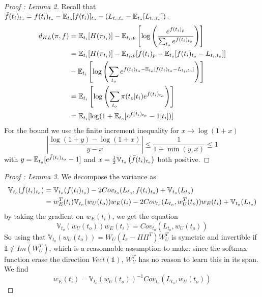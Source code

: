 \documentclass{article}
\begin{document}
\begin{proof}[Proof : Lemma 2]
    Recall that $\Bar{f}(t_i)_{t_o} = f({t_i})_{t_o}-\mathbb{E}_{t_o}[f({t_i})]_{t_o} - (L_{{t_i},{t_o}}-\mathbb{E}_{t_o}[L_{{t_i},{t_o}}])$.
    \begin{equation}
        \begin{split}
            d_{KL}(\pi, f) &= \mathbb{E}_{{t_i}}[H(\pi_{t_i})]-\mathbb{E}_{{t_i},p}\left[\log\left(\frac{e^{f({t_i})_p}}{\sum_{t_o}e^{f({t_i})_{t_o}}}\right)\right]\\
            &=\mathbb{E}_{{t_i}}[H(\pi_{t_i})]-\mathbb{E}_{{t_i},p}[f({t_i})_p-\mathbb{E}_{t_o}[f({t_i})_{t_o}-L_{{t_i},{t_o}}]]\\
            &-\mathbb{E}_{{t_i}}\left[\log\left(\sum_{t_o}e^{f({t_i})_{t_o}-\mathbb{E}_{t_o}[f({t_i})_{t_o}-L_{{t_i},{t_o}}]}\right)\right]\\
            &=\mathbb{E}_{{t_i}}\left[\log\left(\sum_{t_o}\pi({t_o}|{t_i})e^{\Bar{f}(t_i)_{t_o}}\right)\right] \\
            &= \mathbb{E}_{t_i}[\log(1+\mathbb{E}_{t_o}[e^{\Bar{f}(t_i)_{t_o}}-1|{t_i}])]
        \end{split}
    \end{equation}
    For the bound we use the finite increment inequality for $x\rightarrow \log(1+x)$ 
    \[\left|\frac{\log(1+y)-\log(1+x)}{y-x}\right| \leq \frac{1}{1+\min(y,x)} \leq 1\] with $y = \mathbb{E}_{t_o}[e^{\Bar{f}(t_i)_{t_o}}-1]$ and 
    $x = \frac{1}{2}\mathbb{V}_{t_o}\left(\Bar{f}(t_i)_{t_o}\right)$ both positive.
\end{proof}

\bigbreak

\begin{proof}[Proof : Lemma 3] 
    We decompose the variance as
    \begin{equation}
        \begin{split}
            \mathbb{V}_{t_o}(\Bar{f}(t_i)_{t_o}) &= \mathbb{V}_{t_o}(f({t_i})_{t_o}) -2Cov_{t_o}(L_{{t_o}},f({t_i})_{t_o}) + \mathbb{V}_{t_o}(L_{{t_o}})\\
            &= w_E^T({t_i})\mathbb{V}_{t_o}(w_U({t_o}))w_E({t_i}) - 2Cov_{t_o}(L_{{t_o}},w_U^T({t_o}))w_E({t_i}) + \mathbb{V}_{t_o}(L_{{t_o}})\\
        \end{split}
    \end{equation}
    by taking the gradient on $w_E({t_i})$, we get the equation \[\mathbb{V}_{t_o}(w_U({t_o}))w_E({t_i}) = Cov_{t_o}(L_{{t_o}},w_U({t_o}))\] 
    So using that $\mathbb{V}_{t_o}(w_U({t_o})) = W_U(I_{\pi}-\Pi\Pi^T)W_U^T$ is symetric and invertible if $\mathbb{1}\notin Im(W_U^T)$, which is a 
    reasonnable assumption to make: since the softmax function erase the direction $Vect(\mathbb{1})$, $W_U^T$ has no reason to learn this in 
    its span. We find \[w_E({t_i}) = \mathbb{V}_{t_o}(w_U({t_o}))^{-1}Cov_{t_o}(L_{{t_o}},w_U({t_o}))\]
\end{proof}
\end{document}
